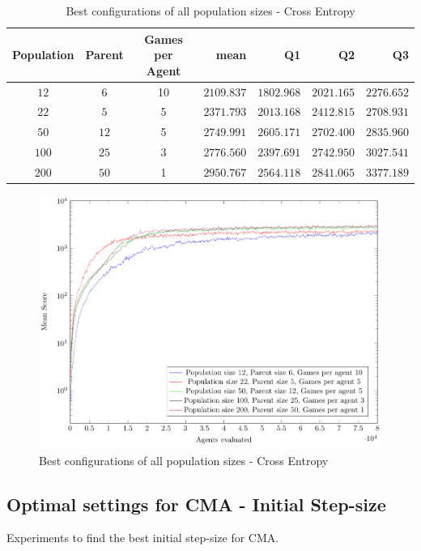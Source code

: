 \clearpage

\begin{table}[H]
\centering
\small
\begin{tabular}{c c c r r r r}
Population & Parent & Games per Agent & mean & Q1 & Q2 & Q3\\
\hline
$12$ & $6$ & 10 & $2109.837$ & $1802.968$ & $2021.165$ & $2276.652$\\
$22$ & $5$ & 5 & $2371.793$ & $2013.168$ & $2412.815$ & $2708.931$\\
$50$ & $12$ & 5 & $2749.991$ & $2605.171$ & $2702.400$ & $2835.960$\\
$100$ & $25$ & 3 & $2776.560$ & $2397.691$ & $2742.950$ & $3027.541$\\
$200$ & $50$ & 1 & $2950.767$ & $2564.118$ & $2841.065$ & $3377.189$\\
\end{tabular}
\caption{Best configurations of all population sizes - Cross Entropy}
\end{table}

\begin{figure}[H]
\centering
\includegraphics[scale=1]{data/ce_population_offspring/bestofall_population/PlotFile.pdf}
\caption{Best configurations of all population sizes - Cross Entropy}
\end{figure}


\clearpage

\subsection{Optimal settings for CMA - Initial Step-size}
Experiments to find the best initial step-size for CMA.

